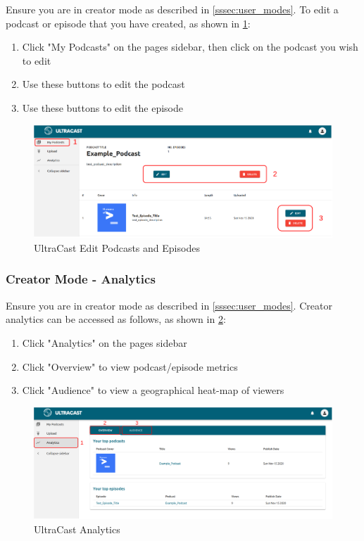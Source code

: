 \documentclass[../report.tex]{subfiles}
\begin{document}
Ensure you are in creator mode as described in \cref{sssec:user_modes}. 
To edit a podcast or episode that you have created, as shown in \cref{fig:UM_edit}:
\begin{enumerate}
    \item Click "My Podcasts" on the pages sidebar, then click on the podcast you wish to edit
    \item Use these buttons to edit the podcast
    \item Use these buttons to edit the episode
\end{enumerate}
\begin{figure}[ht]
    \centering
    \includegraphics[width=16cm]{resources/UM_Edit}
    \caption{UltraCast Edit Podcasts and Episodes}
    \label{fig:UM_edit} 
\end{figure}

\subsubsection{Creator Mode - Analytics}

Ensure you are in creator mode as described in \cref{sssec:user_modes}.
Creator analytics can be accessed as follows, as shown in \cref{fig:UM_Analytics}:
\begin{enumerate}
    \item Click "Analytics" on the pages sidebar
    \item Click "Overview" to view podcast/episode metrics
    \item Click "Audience" to view a geographical heat-map of viewers
\end{enumerate}
\begin{figure}[ht]
    \centering
    \includegraphics[width=16cm]{resources/UM_Analytics}
    \caption{UltraCast Analytics}
    \label{fig:UM_Analytics} 
\end{figure}
\end{document}
